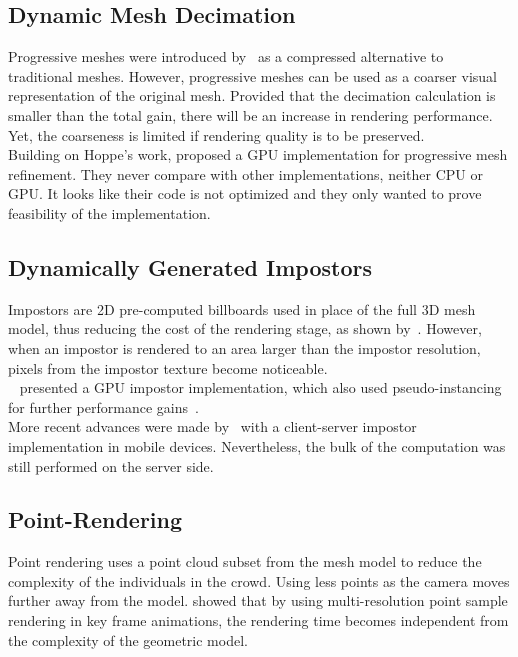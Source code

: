 \documentclass[6pt]{article} %
\begin{document}
\begin{multicols}{2}
\subsection{Dynamic Mesh Decimation}

Progressive meshes were introduced by~\cite{Hoppe1996} as a compressed alternative to traditional meshes.
However, progressive meshes can be used as a coarser visual representation of the original mesh.
Provided that the decimation calculation is smaller than the total gain, there will be an increase in rendering performance.
Yet, the coarseness is limited if rendering quality is to be preserved.\\

Building on Hoppe's work, \cite{Hu2009} proposed a GPU implementation for progressive mesh refinement.
They never compare with other implementations, neither CPU or GPU.
It looks like their code is not optimized and they only wanted to prove feasibility of the implementation. 

\subsection{Dynamically Generated Impostors}
\label{subsec:DimGenImpostors}

Impostors are 2D pre-computed billboards used in place of the full 3D mesh model, thus reducing the cost of the rendering stage, as shown by~\cite{Aubel2000}.
However, when an impostor is rendered to an area larger than the impostor resolution, pixels from the impostor texture become noticeable.\\

~\cite{Millan2006} presented a GPU impostor implementation, which also used pseudo-instancing for further performance gains~\cite{zelsnack2004glsl}.\\

More recent advances were made by~\cite{Ghiletiuc2013} with a client-server impostor implementation in mobile devices.
Nevertheless, the bulk of the computation was still performed on the server side.

\subsection{Point-Rendering}

Point rendering uses a point cloud subset from the mesh model to reduce the complexity of the individuals in the crowd.
Using less points as the camera moves further away from the model.
\cite{Wand2002} showed that by using multi-resolution point sample rendering in key frame animations, the rendering time becomes independent from the complexity of the geometric model.\\


\end{multicols}
\end{document}
